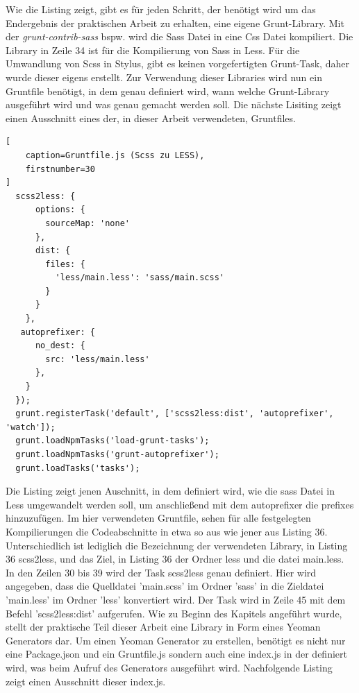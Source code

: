 Wie die Listing zeigt, gibt es für jeden Schritt, der benötigt wird um das Endergebnis der praktischen Arbeit zu erhalten, eine eigene Grunt-Library. Mit der \textit{grunt-contrib-sass} bspw. wird die Sass Datei in eine Css Datei kompiliert. \newline
Die Library in Zeile 34 ist für die Kompilierung von Sass in Less. Für die Umwandlung von Scss in Stylus, gibt es keinen vorgefertigten Grunt-Task, daher wurde dieser eigens erstellt.\newline
Zur Verwendung dieser Libraries wird nun ein Gruntfile benötigt, in dem genau definiert wird, wann welche Grunt-Library ausgeführt wird und was genau gemacht werden soll. Die nächste Lisiting zeigt einen Ausschnitt eines der, in dieser Arbeit verwendeten, Gruntfiles.
\begin{lstlisting}[
	caption=Gruntfile.js (Scss zu LESS),
	firstnumber=30
]
  scss2less: {
      options: {
        sourceMap: 'none'
      },
      dist: {
        files: {
          'less/main.less': 'sass/main.scss'
        }
      }
    },
   autoprefixer: {
      no_dest: {
        src: 'less/main.less'
      },
    }
  });
  grunt.registerTask('default', ['scss2less:dist', 'autoprefixer', 'watch']);
  grunt.loadNpmTasks('load-grunt-tasks');
  grunt.loadNpmTasks('grunt-autoprefixer');
  grunt.loadTasks('tasks');
\end{lstlisting}
Die Listing zeigt jenen Auschnitt, in dem definiert wird, wie die sass Datei in Less umgewandelt werden soll, um anschließend mit dem autoprefixer die prefixes hinzuzufügen.\newline
Im hier verwendeten Gruntfile, sehen für alle festgelegten Kompilierungen die Codeabschnitte in etwa so aus wie jener aus Listing 36. Unterschiedlich ist lediglich die Bezeichnung der verwendeten Library, in Listing 36 scss2less, und das Ziel, in Listing 36 der Ordner less und die datei main.less.\newline\newline
In den Zeilen 30 bis 39 wird der Task scss2less genau definiert. Hier wird angegeben, dass die Quelldatei 'main.scss' im Ordner 'sass' in die Zieldatei 'main.less' im Ordner 'less' konvertiert wird. Der Task wird in Zeile 45 mit dem Befehl 'scss2less:dist' aufgerufen.\newline\newline
Wie zu Beginn des Kapitels angeführt wurde, stellt der praktische Teil dieser Arbeit eine Library in Form eines Yeoman Generators dar. Um einen Yeoman Generator zu erstellen, benötigt es nicht nur eine Package.json und ein Gruntfile.js sondern auch eine index.js in der definiert wird, was beim Aufruf des Generators ausgeführt wird. Nachfolgende Listing zeigt einen Ausschnitt dieser index.js.
